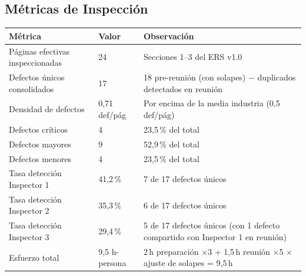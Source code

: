 \documentclass[11pt,a4paper]{article}
\begin{document}
\subsection{Métricas de Inspección}
\begin{longtable}{|p{6cm}|p{2.5cm}|p{5.5cm}|}
\hline
\textbf{Métrica} & \textbf{Valor} & \textbf{Observación} \\
\hline
Páginas efectivas inspeccionadas & 24 & Secciones 1--3 del ERS v1.0 \\
\hline
Defectos únicos consolidados & 17 & 18 pre-reunión (con solapes) $-$ duplicados detectados en reunión \\
\hline
Densidad de defectos & 0,71 def/pág & Por encima de la media industria (0,5 def/pág) \cite{fagan1976} \\
\hline
Defectos críticos & 4 & 23,5\,\% del total \\
\hline
Defectos mayores & 9 & 52,9\,\% del total \\
\hline
Defectos menores & 4 & 23,5\,\% del total \\
\hline
Tasa detección Inspector 1 & 41,2\,\% & 7 de 17 defectos únicos \\
\hline
Tasa detección Inspector 2 & 35,3\,\% & 6 de 17 defectos únicos \\
\hline
Tasa detección Inspector 3 & 29,4\,\% & 5 de 17 defectos únicos (con 1 defecto compartido con Inspector 1 en reunión) \\
\hline
Esfuerzo total & 9,5 h-persona & 2\,h preparación $\times$3 + 1,5\,h reunión $\times$5 $\times$ ajuste de solapes = 9,5\,h \\
\hline
\end{longtable}
\end{document}
